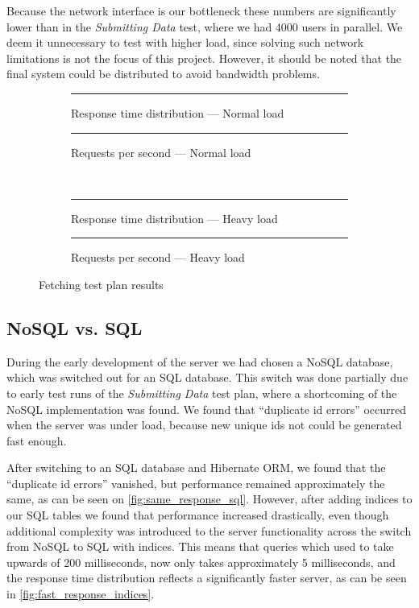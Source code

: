 Because the network interface is our bottleneck these numbers are significantly lower than in the \textit{Submitting Data} test, where we had 4000 users in parallel.
We deem it unnecessary to test with higher load, since solving such network limitations is not the focus of this project.
However, it should be noted that the final system could be distributed to avoid bandwidth problems.

\begin{figure}[!htb]
    \centering
    \begin{subfigure}[b]{0.5\textwidth}
        \centering
        \rule{5cm}{5cm}
        \caption{Response time distribution --- Normal load}\label{fig:fetch_resp_t_dist}
    \end{subfigure}\hfill%
    \begin{subfigure}[b]{0.5\textwidth}
        \centering
        \rule{5cm}{5cm}
        \caption{Requests per second --- Normal load}\label{fig:fetch_reqs_p_sec}
    \end{subfigure}\\
    \begin{subfigure}[b]{0.5\textwidth}
        \centering
        \rule{5cm}{5cm}
        \caption{Response time distribution --- Heavy load}\label{fig:fetch_resp_t_dist_heavy}
    \end{subfigure}\hfill%
    \begin{subfigure}[b]{0.5\textwidth}
        \centering
        \rule{5cm}{5cm}
        \caption{Requests per second --- Heavy load}\label{fig:fetch_reqs_p_sec_heavy}
    \end{subfigure}
    \caption{Fetching test plan results}\label{fig:fetch_test_results}
\end{figure}

\subsection{NoSQL vs. SQL}\label{subsec:nosql_vs._sql}
During the early development of the server we had chosen a NoSQL database, which was switched out for an SQL database.
This switch was done partially due to early test runs of the \textit{Submitting Data} test plan, where a shortcoming of the NoSQL implementation was found.
We found that \enquote{duplicate id errors} occurred when the server was under load, because new unique ids not could be generated fast enough.

After switching to an SQL database and Hibernate ORM, we found that the \enquote{duplicate id errors} vanished, but performance remained approximately the same, as can be seen on \cref{fig:same_response_sql}.
However, after adding indices to our SQL tables we found that performance increased drastically, even though additional complexity was introduced to the server functionality across the switch from NoSQL to SQL with indices.
This means that queries which used to take upwards of 200 milliseconds, now only takes approximately 5 milliseconds, and the response time distribution reflects a significantly faster server, as can be seen in \cref{fig:fast_response_indices}.

